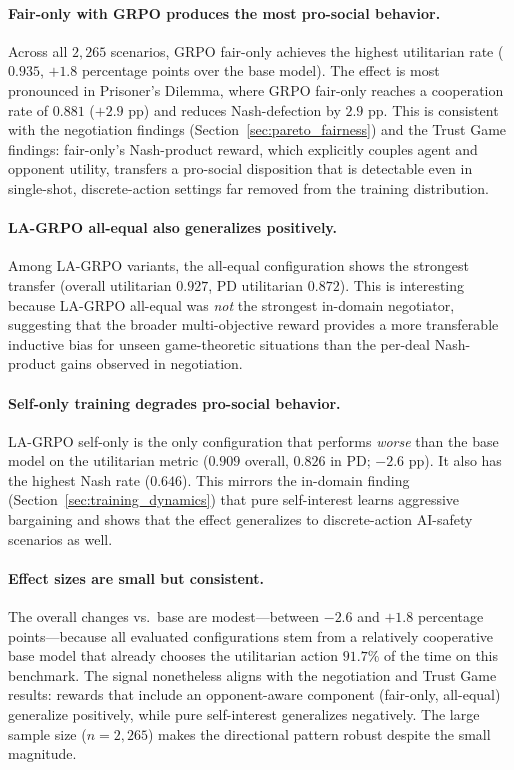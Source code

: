 \documentclass[12pt,a4paper]{article}
\begin{document}
\paragraph{Fair-only with GRPO produces the most pro-social behavior.} Across all $2{,}265$ scenarios, GRPO fair-only achieves the highest utilitarian rate ($0.935$, $+1.8$ percentage points over the base model). The effect is most pronounced in Prisoner's Dilemma, where GRPO fair-only reaches a cooperation rate of $0.881$ ($+2.9$ pp) and reduces Nash-defection by $2.9$ pp. This is consistent with the negotiation findings (Section~\ref{sec:pareto_fairness}) and the Trust Game findings: fair-only's Nash-product reward, which explicitly couples agent and opponent utility, transfers a pro-social disposition that is detectable even in single-shot, discrete-action settings far removed from the training distribution.

\paragraph{LA-GRPO all-equal also generalizes positively.} Among LA-GRPO variants, the all-equal configuration shows the strongest transfer (overall utilitarian $0.927$, PD utilitarian $0.872$). This is interesting because LA-GRPO all-equal was \textit{not} the strongest in-domain negotiator, suggesting that the broader multi-objective reward provides a more transferable inductive bias for unseen game-theoretic situations than the per-deal Nash-product gains observed in negotiation.

\paragraph{Self-only training degrades pro-social behavior.} LA-GRPO self-only is the only configuration that performs \textit{worse} than the base model on the utilitarian metric ($0.909$ overall, $0.826$ in PD; $-2.6$ pp). It also has the highest Nash rate ($0.646$). This mirrors the in-domain finding (Section~\ref{sec:training_dynamics}) that pure self-interest learns aggressive bargaining and shows that the effect generalizes to discrete-action AI-safety scenarios as well.

\paragraph{Effect sizes are small but consistent.} The overall changes vs.\ base are modest---between $-2.6$ and $+1.8$ percentage points---because all evaluated configurations stem from a relatively cooperative base model that already chooses the utilitarian action $91.7\%$ of the time on this benchmark. The signal nonetheless aligns with the negotiation and Trust Game results: rewards that include an opponent-aware component (fair-only, all-equal) generalize positively, while pure self-interest generalizes negatively. The large sample size ($n = 2{,}265$) makes the directional pattern robust despite the small magnitude.
\end{document}
